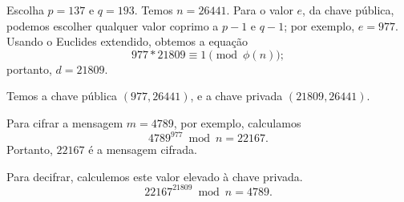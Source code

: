 \documentclass{article}
\begin{document}
Escolha $p = 137$ e $q = 193$.
Temos $n = 26441$.
Para o valor $e$, da chave pública,
podemos escolher qualquer valor coprimo a $p-1$ e $q-1$;
por exemplo, $e = 977$.
Usando o Euclides extendido,
obtemos a equação
\begin{equation*}
    977 * 21809 \equiv 1 \pmod{\phi(n)};
\end{equation*}
portanto, $d = 21809$.

Temos a chave pública $(977, 26441)$, e a chave privada $(21809, 26441)$.

Para cifrar a mensagem $m = 4789$, por exemplo,
calculamos
\begin{equation*}
    4789 ^ {977} \bmod n = 22167.
\end{equation*}
Portanto, $22167$ é a mensagem cifrada.

Para decifrar, calculemos este valor elevado à chave privada.
\begin{equation*}
    22167 ^ {21809} \bmod n = 4789.
\end{equation*}
\end{document}
